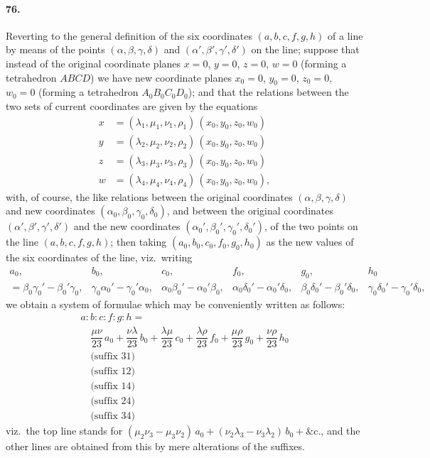\documentclass[11pt,a4paper]{article}
\begin{document}
\paragraph{76.}
Reverting to the general definition of the six coordinates $(a,b,c,f,g,h)$ of
a line by means of the points $(\alpha, \beta, \gamma, \delta)$ and $(\alpha', \beta', \gamma', \delta')$
on the line; suppose that instead of the original coordinate planes $x = 0$, $y = 0$,
$z = 0$, $w = 0$ (forming a tetrahedron $ABCD$) we have new coordinate planes
$x_0 = 0$, $y_0 = 0$, $z_0 = 0$, $w_0 = 0$ (forming a tetrahedron $A_0 B_0 C_0 D_0$); and that the
relations between the two sets of current coordinates are given by the equations
\begin{align*}
x &= (\lambda_1, \mu_1, \nu_1, \rho_1)\,(x_0, y_0, z_0, w_0) \\
y &= (\lambda_2, \mu_2, \nu_2, \rho_2)\,(x_0, y_0, z_0, w_0) \\
z &= (\lambda_3, \mu_3, \nu_3, \rho_3)\,(x_0, y_0, z_0, w_0) \\
w &= (\lambda_4, \mu_4, \nu_4, \rho_4)\,(x_0, y_0, z_0, w_0),
\end{align*}
with, of course, the like relations between the original coordinates
$(\alpha, \beta, \gamma, \delta)$ and new coordinates $(\alpha_0, \beta_0, \gamma_0, \delta_0)$, and between
the original coordinates $(\alpha', \beta', \gamma', \delta')$ and the new coordinates
$(\alpha_0', \beta_0', \gamma_0', \delta_0')$, of the two points on the line $(a,b,c,f,g,h)$; then
taking $(a_0, b_0, c_0, f_0, g_0, h_0)$ as the new values of the six coordinates of the line,
viz.\ writing
\[
\begin{array}{cccccc}
a_0, & b_0, & c_0, & f_0, & g_0, & h_0 \\
= \beta_0 \gamma_0' - \beta_0' \gamma_0, & \gamma_0 \alpha_0' - \gamma_0' \alpha_0, &
 \alpha_0 \beta_0' - \alpha_0' \beta_0, & \alpha_0 \delta_0' - \alpha_0' \delta_0, &
 \beta_0 \delta_0' - \beta_0' \delta_0, & \gamma_0 \delta_0' - \gamma_0' \delta_0,
\end{array}
\]
we obtain a system of formulae which may be conveniently written as follows:
\[
\begin{array}{l}
a : b : c : f : g : h = \\
\quad \dfrac{\mu\nu}{23}\,a_0 + \dfrac{\nu\lambda}{23}\,b_0 + \dfrac{\lambda\mu}{23}\,c_0
 + \dfrac{\lambda\rho}{23}\,f_0 + \dfrac{\mu\rho}{23}\,g_0 + \dfrac{\nu\rho}{23}\,h_0 \\
\quad \text{(suffix 31)} \\
\quad \text{(suffix 12)} \\
\quad \text{(suffix 14)} \\
\quad \text{(suffix 24)} \\
\quad \text{(suffix 34)}
\end{array}
\]
viz.\ the top line stands for $(\mu_2 \nu_3 - \mu_3 \nu_2)\,a_0 + (\nu_2 \lambda_3 - \nu_3 \lambda_2)\,b_0
+ \&\text{c.}$, and the other lines are obtained from this by mere alterations of the
suffixes.
\end{document}
